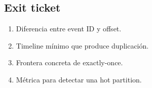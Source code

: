 \documentclass[variant=guia,cover=institutional,mode=print]{ua-engineering-v6-article}
\begin{document}
\subsection*{Exit ticket}
\begin{enumerate}
\item Diferencia entre event ID y offset.
\item Timeline mínimo que produce duplicación.
\item Frontera concreta de exactly-once.
\item Métrica para detectar una hot partition.
\end{enumerate}
\end{document}
